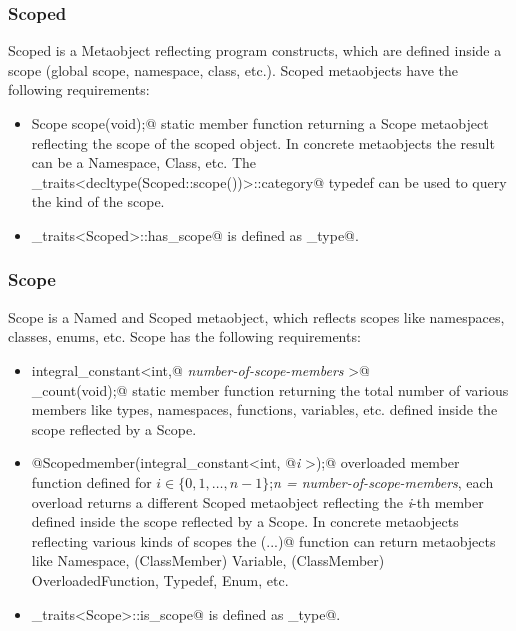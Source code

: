 \subsubsection{Scoped}

{\metaobject Scoped} is a {\metaobject Metaobject} reflecting program constructs,
which are defined inside a scope (global scope, namespace, class, etc.). {\metaobject Scoped}
metaobjects have the following requirements:

\begin{itemize}
	\item{\verb@static Scope scope(void);@} static member function returning
	a {\metaobject Scope} metaobject reflecting the scope of the scoped object.
	In concrete metaobjects the result can be a {\metaobject Namespace}, {\metaobject Class},
	etc. The \verb@metaobject_traits<decltype(Scoped::scope())>::category@ typedef can be used to
	query the kind of the scope.

	\item \verb@metaobject_traits<Scoped>::has_scope@ is defined as \verb@true_type@.
\end{itemize}

\subsubsection{Scope}

{\metaobject Scope} is a {\metaobject Named} and {\metaobject Scoped} metaobject,
which reflects scopes like namespaces, classes, enums, etc. {\metaobject Scope}
has the following requirements:

\begin{itemize}

	\item{\verb@static integral_constant<int,@ {\em number-of-scope-members}
	\verb@>@\\\verb@member_count(void);@} static member function returning the total number
	of various members like types, namespaces, functions, variables, etc. defined inside
	the scope reflected by a {\metaobject Scope}.

	\item{\verb@static @{\metaobject Scoped}\verb@ member(integral_constant<int, @{\em i}
	\verb@>);@} overloaded member function defined
	for $i \in \{0, 1, \dots, n-1\}$;{\em n = number-of-scope-members},
	each overload returns a different {\metaobject Scoped} metaobject reflecting the {\em i}-th member
	defined inside the scope reflected by a {\metaobject Scope}.
	In concrete metaobjects reflecting various kinds of scopes the \verb@member(...)@ function
	can return metaobjects like {\metaobject Namespace}, ({\metaobject ClassMember}) {\metaobject Variable},
	({\metaobject ClassMember}) {\metaobject OverloadedFunction}, {\metaobject Typedef},
	{\metaobject Enum}, etc.

	\item \verb@metaobject_traits<Scope>::is_scope@ is defined as \verb@true_type@.
\end{itemize}

